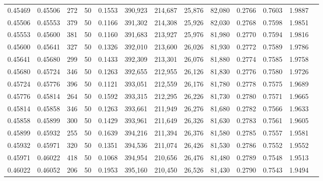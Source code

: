 \begin{tabular}{rrrrrrrrrrrrr}
0.45469 & 0.45506 &   272 &  50 &                                     0.1553 & 390,923 & 214,687 &  25,876 &  82,080 & 0.2766 & 0.7603 & 1.9887 \\
0.45506 & 0.45553 &   379 &  50 &                                     0.1166 & 391,302 & 214,308 &  25,926 &  82,030 & 0.2768 & 0.7598 & 1.9851 \\
0.45553 & 0.45600 &   381 &  50 &                                     0.1160 & 391,683 & 213,927 &  25,976 &  81,980 & 0.2770 & 0.7594 & 1.9816 \\
0.45600 & 0.45641 &   327 &  50 &                                     0.1326 & 392,010 & 213,600 &  26,026 &  81,930 & 0.2772 & 0.7589 & 1.9786 \\
0.45641 & 0.45680 &   299 &  50 &                                     0.1433 & 392,309 & 213,301 &  26,076 &  81,880 & 0.2774 & 0.7585 & 1.9758 \\
0.45680 & 0.45724 &   346 &  50 &                                     0.1263 & 392,655 & 212,955 &  26,126 &  81,830 & 0.2776 & 0.7580 & 1.9726 \\
0.45724 & 0.45776 &   396 &  50 &                                     0.1121 & 393,051 & 212,559 &  26,176 &  81,780 & 0.2778 & 0.7575 & 1.9689 \\
0.45776 & 0.45814 &   264 &  50 &                                     0.1592 & 393,315 & 212,295 &  26,226 &  81,730 & 0.2780 & 0.7571 & 1.9665 \\
0.45814 & 0.45858 &   346 &  50 &                                     0.1263 & 393,661 & 211,949 &  26,276 &  81,680 & 0.2782 & 0.7566 & 1.9633 \\
0.45858 & 0.45899 &   300 &  50 &                                     0.1429 & 393,961 & 211,649 &  26,326 &  81,630 & 0.2783 & 0.7561 & 1.9605 \\
0.45899 & 0.45932 &   255 &  50 &                                     0.1639 & 394,216 & 211,394 &  26,376 &  81,580 & 0.2785 & 0.7557 & 1.9581 \\
0.45932 & 0.45971 &   320 &  50 &                                     0.1351 & 394,536 & 211,074 &  26,426 &  81,530 & 0.2786 & 0.7552 & 1.9552 \\
0.45971 & 0.46022 &   418 &  50 &                                     0.1068 & 394,954 & 210,656 &  26,476 &  81,480 & 0.2789 & 0.7548 & 1.9513 \\
0.46022 & 0.46052 &   206 &  50 &                                     0.1953 & 395,160 & 210,450 &  26,526 &  81,430 & 0.2790 & 0.7543 & 1.9494 \\

\end{tabular}
